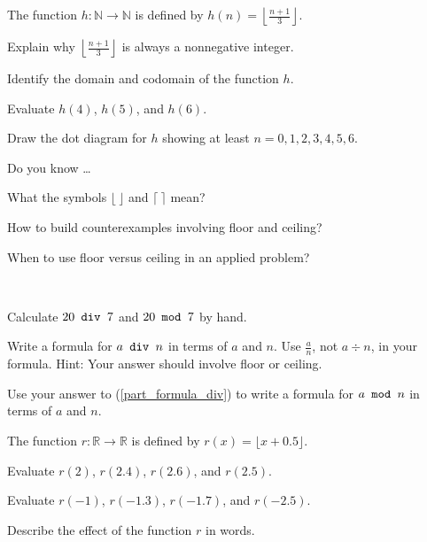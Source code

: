 \begin{exer}[\exerU] %
\label{exer_floor_nover3}
    The function $h: \mathbb{N} \to \mathbb{N}$ is defined by $h(n) = \left\lfloor \frac{n+1}{3} \right\rfloor$. 
        \begin{exerpart}
        \item Explain why $\left\lfloor \frac{n+1}{3} \right\rfloor$ is always a nonnegative integer.
        \item Identify the domain and codomain of the function $h$.
        \item Evaluate $h(4)$, $h(5)$, and $h(6)$.
        \item Draw the dot diagram for $h$ showing at least $n=0,1,2,3,4,5,6$.  
        \end{exerpart}
\end{exer}

\begin{exer}[\exerR] %
\label{exer_dyk_floor_ceil}
    Do you know \ldots
        \begin{exerpart}
            \item What the symbols $\lfloor ~ \rfloor$ and $\lceil ~ \rceil$ mean?
            \item How to build counterexamples involving floor and ceiling?
            \item When to use floor versus ceiling in an applied problem?
        \end{exerpart}
\end{exer}

\begin{exer}[\exerE] %
\label{exer_div_mod_formulas} 
~
    \begin{exerpart}
        \item Calculate $20 \texttt{ div } 7$ and $20 \texttt{ mod } 7$ by hand.
        \item \label{part_formula_div} Write a formula for $a \texttt{ div } n$ in terms of $a$ and $n$.  Use $\frac{a}{n}$, not $a \div n$, in your formula.  Hint: Your answer should involve floor or ceiling.
        \item Use your answer to (\ref{part_formula_div}) to write a formula for $a \texttt{ mod } n$ in terms of $a$ and $n$.
        \end{exerpart}
\end{exer}

\begin{exer}[\exerE] %
\label{exer_rounding_off_function}
    The function $r: \mathbb{R} \to \mathbb{R}$ is defined by $r(x)= \lfloor x + 0.5\rfloor$.
        \begin{exerpart}
            \item Evaluate $r(2)$, $r(2.4)$, $r(2.6)$, and $r(2.5)$.
            \item Evaluate $r(-1)$, $r(-1.3)$, $r(-1.7)$, and $r(-2.5)$.
            \item Describe the effect of the function $r$ in words.
        \end{exerpart}   
\end{exer}

